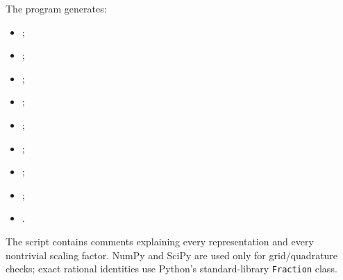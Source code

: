\documentclass[11pt,oneside]{article}
\numberwithin{equation}{section}
\theoremstyle{definition}
\theoremstyle{remark}
\begin{document}
The program generates:
\begin{itemize}
\item {};
\item {};
\item {};
\item {};
\item {};
\item {};
\item {};
\item {};
\item {}.
\end{itemize}
The script contains comments explaining every representation and every nontrivial scaling
factor.  NumPy and SciPy are used only for grid/quadrature checks; exact rational identities
use Python's standard-library \texttt{Fraction} class.
\end{document}
